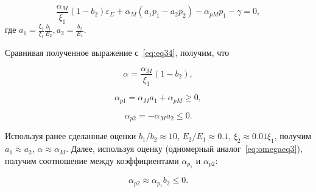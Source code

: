 \begin{equation}
  \label{eq:destroy1}
  \frac{\alpha_M }{\xi_1} (1 - b_2) \varepsilon_{\Sigma} + \alpha_M(a_1 p_1 - a_2 p_2) - \alpha_{pM}p_1- \gamma = 0,
\end{equation}
где $a_1=\frac{\xi_2}{\xi_1}\frac{b_1}{E_2}, a_2 = \frac{b_2}{E_1}$.

Сравнивая полученное выражение с~\eqref{eq:eq34}, получим, что

\begin{equation}
  \label{eq:destroy2}
  \alpha = \frac{\alpha_M}{\xi_1} (1 - b_2),
\end{equation}

\begin{equation}
  \label{eq:destroy3}
  \alpha_{p1} = \alpha_{M}a_1+ \alpha_{pM} \geq 0,
\end{equation}

\begin{equation}
  \label{eq:destroy4}
  \alpha_{p2} = - \alpha_{M}a_2 \leq 0.
\end{equation}

Используя ранее сделанные оценки $b_1/b_2 \approx 10$, $E_2/E_1 \approx 0.1$, $\xi_2 \approx 0.01 \xi_1$, получим $a_1 \approx a_2$, $\alpha \approx \alpha_M$. Далее, используя оценку  (одномерный аналог~\eqref{eq:omegaeq3}), получим соотношение между коэффициентами $\alpha_{p_1}$ и $\alpha_{p2}$:

\begin{equation}
  \label{eq:destroy4}
  \alpha_{p2} \approx \alpha_{p_1} b_2 \leq 0.
\end{equation}


